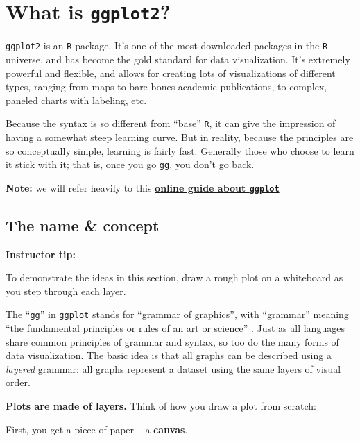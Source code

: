 \documentclass[
]{book}
\begin{document}
\hypertarget{what-is-ggplot2}{%
\section*{\texorpdfstring{What is \texttt{ggplot2}?}{What is ggplot2?}}\label{what-is-ggplot2}}

\texttt{ggplot2} is an \texttt{R} package. It's one of the most downloaded packages in the \texttt{R} universe, and has become the gold standard for data visualization. It's extremely powerful and flexible, and allows for creating lots of visualizations of different types, ranging from maps to bare-bones academic publications, to complex, paneled charts with labeling, etc.

Because the syntax is so different from ``base'' \texttt{R}, it can give the impression of having a somewhat steep learning curve. But in reality, because the principles are so conceptually simple, learning is fairly fast. Generally those who choose to learn it stick with it; that is, once you go \texttt{gg}, you don't go back.

\textbf{Note:} we will refer heavily to this \href{https://ggplot2-book.org/introduction.html}{\textbf{online guide about \texttt{ggplot}}}

\hypertarget{the-name-concept}{%
\subsection*{The name \& concept}\label{the-name-concept}}

\leavevmode{}%
\textbf{Instructor tip:}

To demonstrate the ideas in this section, draw a rough plot on a whiteboard as you step through each layer.

The ``\texttt{gg}'' in \texttt{ggplot} stands for ``grammar of graphics'', with ``grammar'' meaning ``the fundamental principles or rules of an art or science'' \citep{layered-grammar}. Just as all languages share common principles of grammar and syntax, so too do the many forms of data visualization. The basic idea is that all graphs can be described using a \emph{layered} grammar: all graphs represent a dataset using the same layers of visual order.

\textbf{Plots are made of layers.} Think of how you draw a plot from scratch:

First, you get a piece of paper -- a \textbf{canvas}.
\end{document}

